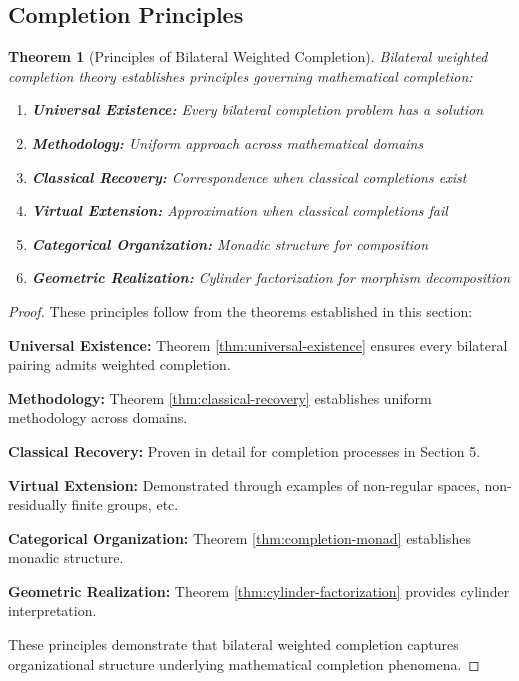 \documentclass[11pt]{article}
\theoremstyle{plain}
\newtheorem{theorem}{Theorem}[section]
\theoremstyle{definition}
\theoremstyle{remark}
\begin{document}
\subsection{Completion Principles}

\begin{theorem}[Principles of Bilateral Weighted Completion]\label{thm:universal-principles}
Bilateral weighted completion theory establishes principles governing mathematical completion:

\begin{enumerate}
\item \textbf{Universal Existence:} Every bilateral completion problem has a solution
\item \textbf{Methodology:} Uniform approach across mathematical domains  
\item \textbf{Classical Recovery:} Correspondence when classical completions exist
\item \textbf{Virtual Extension:} Approximation when classical completions fail
\item \textbf{Categorical Organization:} Monadic structure for composition
\item \textbf{Geometric Realization:} Cylinder factorization for morphism decomposition
\end{enumerate}
\end{theorem}

\begin{proof}
These principles follow from the theorems established in this section:

\textbf{Universal Existence:} Theorem \ref{thm:universal-existence} ensures every bilateral pairing admits weighted completion.

\textbf{Methodology:} Theorem \ref{thm:classical-recovery} establishes uniform methodology across domains.

\textbf{Classical Recovery:} Proven in detail for completion processes in Section 5.

\textbf{Virtual Extension:} Demonstrated through examples of non-regular spaces, non-residually finite groups, etc.

\textbf{Categorical Organization:} Theorem \ref{thm:completion-monad} establishes monadic structure.

\textbf{Geometric Realization:} Theorem \ref{thm:cylinder-factorization} provides cylinder interpretation.

These principles demonstrate that bilateral weighted completion captures organizational structure underlying mathematical completion phenomena.
\end{proof}
\end{document}
